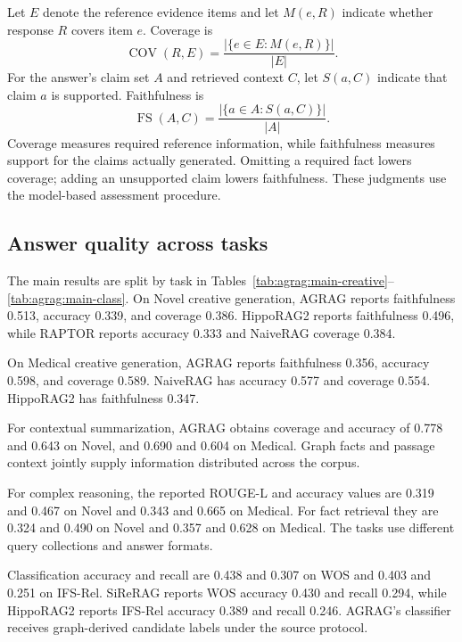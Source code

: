 Let $E$ denote the reference evidence items and let $M(e,R)$ indicate whether response $R$ covers item $e$. Coverage is
\begin{equation}
\operatorname{COV}(R,E)=\frac{|\{e\in E:M(e,R)\}|}{|E|}.
\label{eq:agrag:coverage}
\end{equation}
For the answer's claim set $A$ and retrieved context $C$, let $S(a,C)$ indicate that claim $a$ is supported. Faithfulness is
\begin{equation}
\operatorname{FS}(A,C)=\frac{|\{a\in A:S(a,C)\}|}{|A|}.
\label{eq:agrag:faithfulness}
\end{equation}
Coverage measures required reference information, while faithfulness measures support for the claims actually generated. Omitting a required fact lowers coverage; adding an unsupported claim lowers faithfulness. These judgments use the model-based assessment procedure.







\subsection{Answer quality across tasks}
The main results are split by task in Tables~\ref{tab:agrag:main-creative}--\ref{tab:agrag:main-class}. On Novel creative generation, AGRAG reports faithfulness 0.513, accuracy 0.339, and coverage 0.386. HippoRAG2 reports faithfulness 0.496, while RAPTOR reports accuracy 0.333 and NaiveRAG coverage 0.384.

On Medical creative generation, AGRAG reports faithfulness 0.356, accuracy 0.598, and coverage 0.589. NaiveRAG has accuracy 0.577 and coverage 0.554. HippoRAG2 has faithfulness 0.347.

For contextual summarization, AGRAG obtains coverage and accuracy of 0.778 and 0.643 on Novel, and 0.690 and 0.604 on Medical. Graph facts and passage context jointly supply information distributed across the corpus.

For complex reasoning, the reported ROUGE-L and accuracy values are 0.319 and 0.467 on Novel and 0.343 and 0.665 on Medical. For fact retrieval they are 0.324 and 0.490 on Novel and 0.357 and 0.628 on Medical. The tasks use different query collections and answer formats.

Classification accuracy and recall are 0.438 and 0.307 on WOS and 0.403 and 0.251 on IFS-Rel. SiReRAG reports WOS accuracy 0.430 and recall 0.294, while HippoRAG2 reports IFS-Rel accuracy 0.389 and recall 0.246. AGRAG's classifier receives graph-derived candidate labels under the source protocol.

